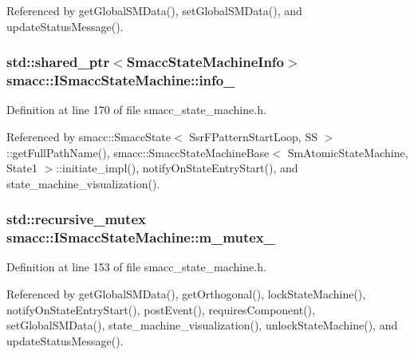 Referenced by get\+Global\+S\+M\+Data(), set\+Global\+S\+M\+Data(), and update\+Status\+Message().

\subsubsection[{\texorpdfstring{info\+\_\+}{info_}}]{\setlength{\rightskip}{0pt plus 5cm}std\+::shared\+\_\+ptr$<${\bf Smacc\+State\+Machine\+Info}$>$ smacc\+::\+I\+Smacc\+State\+Machine\+::info\+\_\+}\hypertarget{classsmacc_1_1ISmaccStateMachine_a5ec3201cbddab4f062f572fb33021041}{}\label{classsmacc_1_1ISmaccStateMachine_a5ec3201cbddab4f062f572fb33021041}


Definition at line 170 of file smacc\+\_\+state\+\_\+machine.\+h.



Referenced by smacc\+::\+Smacc\+State$<$ Ssr\+F\+Pattern\+Start\+Loop, S\+S $>$\+::get\+Full\+Path\+Name(), smacc\+::\+Smacc\+State\+Machine\+Base$<$ Sm\+Atomic\+State\+Machine, State1 $>$\+::initiate\+\_\+impl(), notify\+On\+State\+Entry\+Start(), and state\+\_\+machine\+\_\+visualization().

\subsubsection[{\texorpdfstring{m\+\_\+mutex\+\_\+}{m_mutex_}}]{\setlength{\rightskip}{0pt plus 5cm}std\+::recursive\+\_\+mutex smacc\+::\+I\+Smacc\+State\+Machine\+::m\+\_\+mutex\+\_\+\hspace{0.3cm}{\ttfamily [private]}}\hypertarget{classsmacc_1_1ISmaccStateMachine_aac785541646e5c517273bf31072505a1}{}\label{classsmacc_1_1ISmaccStateMachine_aac785541646e5c517273bf31072505a1}


Definition at line 153 of file smacc\+\_\+state\+\_\+machine.\+h.



Referenced by get\+Global\+S\+M\+Data(), get\+Orthogonal(), lock\+State\+Machine(), notify\+On\+State\+Entry\+Start(), post\+Event(), requires\+Component(), set\+Global\+S\+M\+Data(), state\+\_\+machine\+\_\+visualization(), unlock\+State\+Machine(), and update\+Status\+Message().

